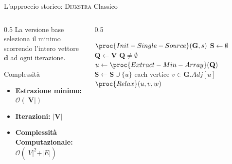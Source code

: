 \documentclass[aspectratio=169]{beamer}
\begin{document}
\begin{frame}[fragile]{L'approccio storico: \textsc{Dijkstra} Classico}
    \begin{columns}
        \begin{column}{0.5\textwidth}
            La versione base seleziona il minimo scorrendo l'intero vettore $\mathbf{d}$ ad ogni iterazione.
            \vspace{0.2cm}
            \begin{block}{Complessità}
                \begin{itemize}
                    \item \textbf{Estrazione minimo:} $\mathcal{O}(\vert\mathbf{V}\vert)$
                    \item \textbf{Iterazioni:} $\vert\mathbf{V}\vert$
                    \item \textbf{Complessità Computazionale:} $\mathcal{O}(\vert V\vert^2 + \vert E\vert)$
                \end{itemize}
            \end{block}
        \end{column}
        \begin{column}{0.5\textwidth}
            \scriptsize
            \begin{codebox}
            \li $\proc{Init-Single-Source}(\mathbf{G}, s)$
            \li $\mathbf{S} \gets \emptyset$
            \li $\mathbf{Q} \gets \mathbf{V}$
            \li \While $\mathbf{Q} \neq \emptyset$
            \li   \Do $u \gets \proc{Extract-Min-Array}(\mathbf{Q})$
            \li       $\mathbf{S} \gets \mathbf{S} \cup \{u\}$
            \li       \For each vertice $v \in \mathbf{G}.Adj[u]$
            \li           \Do $\proc{Relax}(u, v, w)$
                    \End
                \End
            \end{codebox}
        \end{column}
    \end{columns}
\end{frame}
\end{document}
